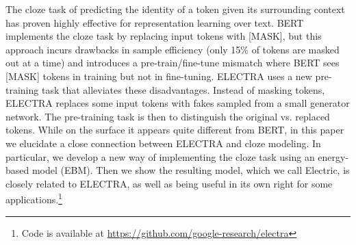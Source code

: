 \documentclass[11pt,a4paper]{article}
\newcommand{\kc}[1]{\textcolor{red}{KC: #1}}
\newcommand{\kc}[1]{}
\begin{document}


The cloze task \citep{Taylor1953ClozePA} of predicting the identity of a token given its surrounding context has proven highly effective for representation learning over text. BERT \citep{devlin2018bert} implements the cloze task by replacing input tokens with [MASK], but this approach incurs drawbacks in sample efficiency (only 15\% of tokens are masked out at a time) and introduces a pre-train/fine-tune mismatch where BERT sees [MASK] tokens in training but not in fine-tuning. 
ELECTRA \citep{clark2020electra} uses a new pre-training task that alleviates these disadvantages. Instead of masking tokens, ELECTRA replaces some input tokens with fakes sampled from a small generator network. The pre-training task is then to distinguish the original vs. replaced tokens. 
While on the surface it appears quite different from BERT, in this paper we elucidate a close connection between ELECTRA and cloze modeling.
In particular, we develop a new way of implementing the cloze task using an energy-based model (EBM).
Then we show the resulting model, which we call Electric, is closely related to ELECTRA, as well as being useful in its own right for some applications.\footnote{Code is available at \url{https://github.com/google-research/electra}}  
\end{document}
